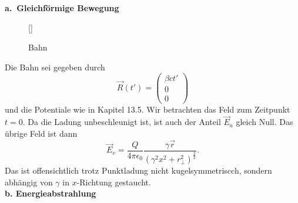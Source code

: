 \textbf{a.\ Gleichförmige Bewegung}\\


\begin{wrapfigure}[10]{r}[0cm]{0cm}
	\raisebox{0pt}[\dimexpr{}\baselineskip\relax]{
		\colorbox{hgrey}{
		}
	}
	\caption{Bahn}
\end{wrapfigure}
Die Bahn sei gegeben durch
\begin{equation*}
\vec{R}(t')=\begin{pmatrix}
\beta ct' \\ 0 \\ 0
\end{pmatrix}
\end{equation*}
und die Potentiale wie in Kapitel 13.5. Wir betrachten das Feld zum Zeitpunkt $t=0$. Da die Ladung unbeschleunigt ist, ist auch der Anteil $\vec{E}_a$ gleich Null. Das übrige Feld ist dann
\begin{equation*}
\vec{E}_v = \frac{Q}{4\pi\epsilon_0}\frac{\gamma\vec{r}}{(\gamma^2x^2+r_\perp^2)^\frac{3}{2}}.
\end{equation*}
Das ist offensichtlich trotz Punktladung nicht kugelsymmetriscch, sondern abhängig von $\gamma$ in $x$-Richtung gestaucht.\\

\textbf{b. Energieabstrahlung}\\

